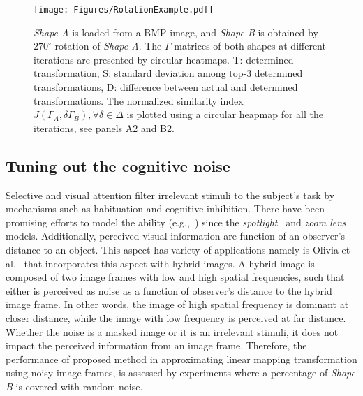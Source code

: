 \begin{figure*}[!ht]
	\centering
	\texttt{[image: Figures/RotationExample.pdf]}
	\caption
	{
		\textit{Shape A} is loaded from a BMP image, and \textit{Shape B} is obtained by $270^\circ$ rotation of \textit{Shape A}. The $\Gamma$ matrices of both shapes at different iterations are presented by circular heatmaps. T: determined transformation, S: standard deviation among top-3 determined transformations, D: difference between actual and determined transformations. The normalized similarity index $J(\Gamma_A, \delta \Gamma_B), \forall\delta \in \Delta$ is plotted using a circular heapmap for all the iterations, see panels A2 and B2.  
	}
	\label{Figure: 270}
\end{figure*}


\subsection{Tuning out the cognitive noise}
Selective and visual attention filter irrelevant stimuli to the subject's task by mechanisms such as habituation and cognitive inhibition. There have been promising efforts to model the ability (e.g.,~\cite{tsotsos1995modeling}) since the \textit{spotlight}~\cite{eriksen1972temporal} and \textit{zoom lens}~\cite{eriksen1986visual} models. Additionally, perceived visual information are function of an observer's distance to an object. This aspect has variety of applications namely is Olivia et al.~\cite{oliva2006hybrid} that incorporates this aspect with hybrid images. A hybrid image is composed of two image frames with low and high spatial frequencies, such that either is perceived as noise as a function of observer's distance to the hybrid image frame. In other words, the image of high spatial frequency is dominant at closer distance, while the image with low frequency is perceived at far distance. Whether the noise is a masked image or it is an irrelevant stimuli, it does not impact the perceived information from an image frame. Therefore, the performance of proposed method in approximating linear mapping transformation using noisy image frames, is assessed by experiments where a percentage of \textit{Shape B} is covered with random noise. 

